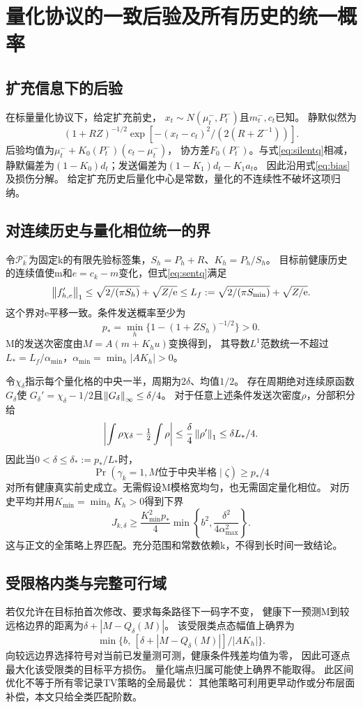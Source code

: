 \section{量化协议的一致后验及所有历史的统一概率}
\label{app:uniform}
\subsection{扩充信息下的后验}
在标量量化协议下，给定扩充前史，
$x_t\sim N(\mu_t^-,P_t^-)$且$m_t^-,c_t$已知。
静默似然为
\[
(1+RZ)^{-1/2}\exp[-(x_t-c_t)^2/(2(R+Z^{-1}))].
\]
后验均值为$\mu_t^-+K_0(P_t^-)(c_t-\mu_t^-)$，
协方差$F_0(P_t^-)$。与式\eqref{eq:silentq}相减，
静默偏差为$(1-K_0)d_t$；发送偏差为$(1-K_1)d_t-K_1a_t$。
因此沿用式\eqref{eq:bias}及损伤分解。
给定扩充历史后量化中心是常数，量化的不连续性不破坏这项归纳。

\subsection{对连续历史与量化相位统一的界}
令$\mathcal P_k^-$为固定k的有限先验标签集，$S_h=P_h+R$、$K_h=P_h/S_h$。
目标前健康历史的连续值使m和$e=c_k-m$变化，但式\eqref{eq:sentq}满足
\[
\left\|f'_{h,e}\right\|_1
\le \sqrt{2/(\pi S_h)}+\sqrt{Z/\mathrm e}
\le L_f:=\sqrt{2/(\pi S_{\min})}+\sqrt{Z/\mathrm e}.
\]
这个界对e平移一致。条件发送概率至少为
\[
p_*=\min_h\{1-(1+ZS_h)^{-1/2}\}>0.
\]
M的发送次密度由$M=A(m+K_hu)$变换得到，
其导数$L^1$范数统一不超过
$L_*=L_f/\alpha_{\min}$，$\alpha_{\min}=\min_h|AK_h|>0$。

令$\chi_\delta$指示每个量化格的中央一半，周期为$2\delta$、均值$1/2$。
存在周期绝对连续原函数$G_\delta$使
$G_\delta'=\chi_\delta-1/2$且$\left\|G_\delta\right\|_\infty\le\delta/4$。
对于任意上述条件发送次密度$\rho$，分部积分给
\[
\left|\int\rho\chi_\delta-\tfrac12\int\rho\right|
\le\frac{\delta}{4}\left\|\rho'\right\|_1\le\delta L_*/4.
\]
因此当$0<\delta\le\delta_*:=p_*/L_*$时，
\[
\Pr(\gamma_k=1,M\text{位于中央半格}\mid\zeta)\ge p_*/4
\]
对所有健康真实前史成立。无需假设M模格宽均匀，也无需固定量化相位。
对历史平均并用$K_{\min}=\min_hK_h>0$得到下界
\[
J_{k,\delta}\ge
\frac{K_{\min}^2p_*}{4}
\min\left\{b^2,\frac{\delta^2}{4\alpha_{\max}^2}\right\}.
\]
这与正文的全策略上界匹配。充分范围和常数依赖k，不得到长时间一致结论。

\subsection{受限格内类与完整可行域}
若仅允许在目标拍首次修改、要求每条路径下一码字不变，
健康下一预测M到较远格边界的距离为$\delta+|M-Q_\delta(M)|$。
该受限类点态幅值上确界为
\[
\min\{b,\,[\delta+|M-Q_\delta(M)|]/|AK_h|\}.
\]
向较远边界选择符号对当前已发量测可测，健康条件残差均值为零，
因此可逐点最大化该受限类的目标平方损伤。
量化端点归属可能使上确界不能取得。
此区间优化不等于所有零记录TV策略的全局最优：
其他策略可利用更早动作或分布层面补偿，本文只给全类匹配阶数。
